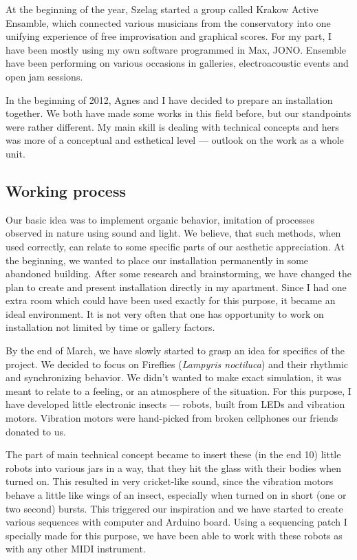 \documentclass[12pt,a4paper,oneside]{report}
\begin{document}
At the beginning of the year, Szelag started a group called Krakow Active Ensamble, which connected various musicians from the conservatory into one unifying experience of free improvisation and graphical scores. For my part, I have been mostly using my own software programmed in Max, JONO. Ensemble have been performing on various occasions in galleries, electroacoustic events and open jam sessions.

In the beginning of 2012, Agnes and I have decided to prepare an installation together. We both have made some works in this field before, but our standpoints were rather different. My main skill is dealing with technical concepts and hers was more of a conceptual and esthetical level --- outlook on the work as a whole unit. 

\subsection{Working process} Our basic idea was to implement organic behavior, imitation of processes observed in nature using sound and light. We believe, that such methods, when used correctly, can relate to some specific parts of our aesthetic appreciation. At the beginning, we wanted to place our installation permanently in some abandoned building. After some research and brainstorming, we have changed the plan to create and present installation directly in my apartment. Since I had one extra room which could have been used exactly for this purpose, it became an ideal environment. It is not very often that one has opportunity to work on installation not limited by time or gallery factors.

By the end of March, we have slowly started to grasp an idea for specifics of the project. We decided to focus on Fireflies (\emph{Lampyris noctiluca}) and their rhythmic and synchronizing behavior. We didn't wanted to make exact simulation, it was meant to relate to a feeling, or an atmosphere of the situation. For this purpose, I have developed little electronic insects --- robots, built from LEDs and vibration motors. Vibration motors were hand-picked from broken cellphones our friends donated to us. 

The part of main technical concept became to insert these (in the end 10) little robots into various jars in a way, that they hit the glass with their bodies when turned on. This resulted in very cricket-like sound, since the vibration motors behave a little like wings of an insect, especially when turned on in short (one or two second) bursts. This triggered our inspiration and we have started to create various sequences with computer and Arduino board. Using a sequencing patch I specially made for this purpose, we have been able to work with these robots as with any other MIDI instrument.
\end{document}
